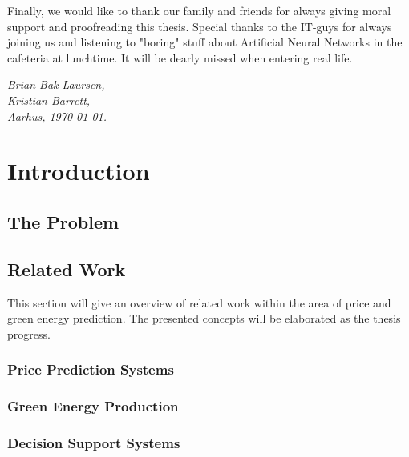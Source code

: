 \documentclass[twoside,11pt,openright]{report}
\begin{document}
Finally, we would like to thank our family and friends for always giving moral support and proofreading this thesis. Special thanks to the IT-guys for always joining us and listening to "boring" stuff about Artificial Neural Networks in the cafeteria at lunchtime. It will be dearly missed when entering real life.

\vspace{2ex}
\begin{flushright}
  \emph{Brian Bak Laursen,}\\
  \emph{Kristian Barrett,}\\
  \emph{Aarhus, \today.}
\end{flushright}

\tableofcontents
\listoffigures
\newpage
{}
\setcounter{secnumdepth}{2}


\chapter{Introduction}
\label{ch:intro}
\section{The Problem}

\section{Related Work}
This section will give an overview of related work within the area of price and green energy prediction. The presented concepts will be elaborated as the thesis progress.
\subsection{Price Prediction Systems}


\subsection{Green Energy Production}
\label{sec:greeEnergyProductionIntroduction}



\subsection{Decision Support Systems}

\end{document}
